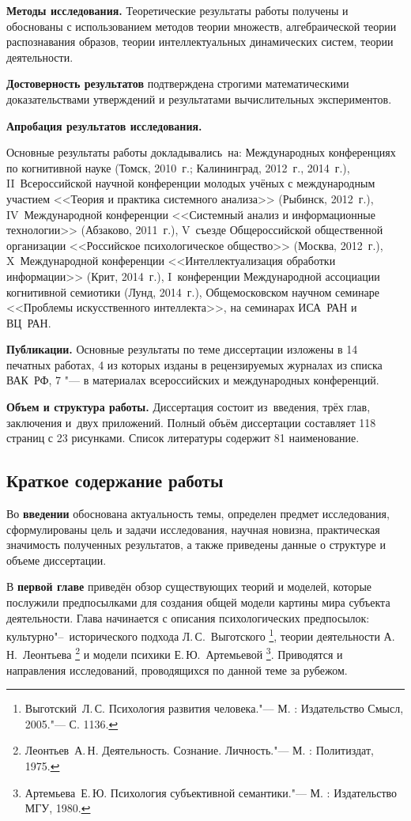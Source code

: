 \textbf{Методы исследования.} Теоретические результаты работы получены и обоснованы с использованием методов теории множеств, алгебраической теории распознавания образов, теории интеллектуальных динамических систем, теории деятельности.

\textbf{Достоверность результатов} подтверждена строгими математическими доказательствами утверждений и результатами вычислительных экспериментов.

\textbf{Апробация результатов исследования.}

Основные результаты работы докладывались~на: Международных конференциях по когнитивной науке (Томск, 2010~г.; Калининград, 2012~г., 2014~г.), II~Всероссийской научной конференции молодых учёных с международным участием <<Теория и практика системного анализа>> (Рыбинск, 2012~г.), IV~Международной конференции <<Системный анализ и информационные технологии>> (Абзаково, 2011~г.), V~съезде Общероссийской общественной организации <<Российское психологическое общество>> (Москва, 2012~г.), X~Международной конференции <<Интеллектуализация обработки информации>> (Крит, 2014~г.), I~конференции Международной ассоциации когнитивной семиотики (Лунд, 2014~г.), Общемосковском научном семинаре <<Проблемы искусственного интеллекта>>, на семинарах ИСА~РАН и ВЦ~РАН.

\textbf{Публикации.} Основные результаты по теме диссертации изложены в 14 печатных работах, 4 из которых изданы в рецензируемых журналах из списка ВАК~РФ, 7 "--- в материалах всероссийских и международных конференций.

\textbf{Объем и структура работы.} Диссертация состоит из~введения, трёх глав, заключения и~двух приложений. Полный объём диссертации составляет 118 страниц с 23 рисунками. Список литературы содержит 81 наименование.

\newpage
\subsection*{\Large Краткое содержание работы}
Во \textbf{введении} обоснована актуальность темы, определен предмет исследования, сформулированы цель и задачи исследования, научная новизна, практическая значимость полученных результатов, а также приведены данные о структуре и объеме диссертации.

В \textbf{первой главе} приведён обзор существующих теорий и моделей, которые послужили предпосылками для создания общей модели картины мира субъекта деятельности. Глава начинается с описания психологических предпосылок: культурно"--~исторического подхода Л.\,С.~Выготского \footnote{Выготский~Л.\,С. Психология развития человека."--- М. : Издательство Смысл, 2005."---	С. 1136.}, теории деятельности А.\,Н.~Леонтьева \footnote{Леонтьев~А.\,Н. Деятельность. Сознание. Личность."--- М. : Политиздат, 1975.} и модели психики Е.\,Ю.~Артемьевой \footnote{Артемьева~Е.\,Ю. Психология субъективной семантики."--- М. : Издательство МГУ, 1980.}. Приводятся и направления исследований, проводящихся по данной теме за рубежом.

